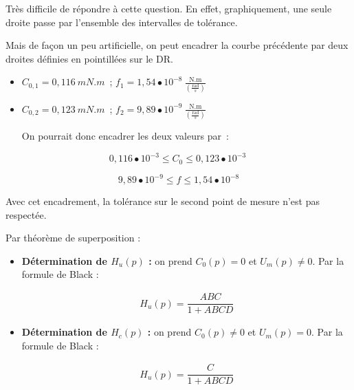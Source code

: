 



\begin{texteCache}

Très difficile de répondre à cette question. En effet, graphiquement,
  une seule droite passe par l'ensemble des intervalles de tolérance.

  Mais de façon un peu artificielle, on peut encadrer la courbe
  précédente par deux droites définies en pointillées sur le DR.

\begin{itemize}
\item
  \(C_{0,1} = 0,116\ mN.m\)~;
  \(f_{1} = 1,54 \bullet 10^{- 8}\ \frac{\text{N.m}}{\left( \frac{\text{rad}}{s} \right)}\)
\item
  \(C_{0,2} = 0,123\ mN.m\)~;
  \(f_{2} = 9,89 \bullet 10^{- 9}\ \frac{\text{N.m}}{\left( \frac{\text{rad}}{s} \right)}\)

  On pourrait donc encadrer les deux valeurs par~:
\end{itemize}

\[0,116 \bullet 10^{- 3} \leq C_{0} \leq 0,123 \bullet 10^{- 3}\ \]

\[9,89 \bullet 10^{- 9} \leq f \leq 1,54 \bullet 10^{- 8}\]

Avec cet encadrement, la tolérance sur le second point de mesure n'est
pas respectée.

\end{texteCache}


\begin{texteCache}
Par théorème de superposition : 
\begin{itemize}
\item \textbf{Détermination de $H_u(p)$ : } on prend $C_0(p)=0$ et $U_m(p)\neq 0$.
Par la formule de Black : 

\begin{align*}
H_u(p)=\dfrac{ABC}{1+ABCD}
\end{align*}
\item \textbf{Détermination de $H_c(p)$ : } on prend $C_0(p)\neq 0$ et $U_m(p)= 0$.
Par la formule de Black : 

\begin{align*}
H_u(p)=\dfrac{C}{1+ABCD}
\end{align*}
\end{itemize}
\end{texteCache}

